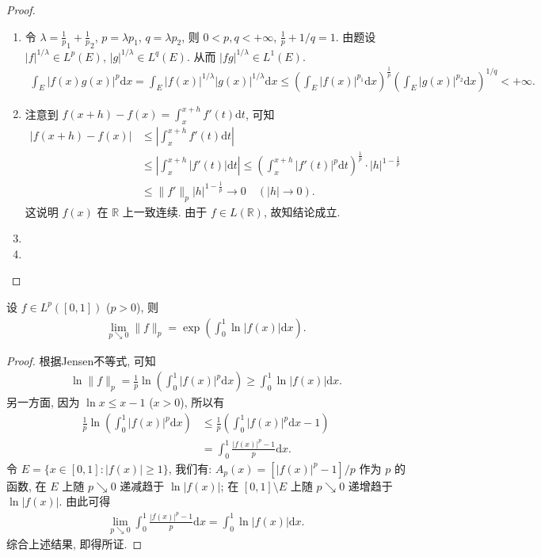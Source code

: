 \documentclass[../../main.tex]{subfiles}%
\begin{document}
\begin{proof}
\begin{enumerate}[(1)]
\item 令 $\lambda=\frac{1}{p}_1+\frac{1}{p}_2$, $p=\lambda p_1$, $q=\lambda p_2$, 则 $0<p,q<+\infty$, $\frac{1}{p}+1/q=1$. 由题设 $|f|^{1/\lambda}\in L^p(E)$, $|g|^{1/\lambda}\in L^q(E)$. 从而 $|fg|^{1/\lambda}\in L^1(E)$.
\begin{align*}
\int_E |f(x)g(x)|^p \mathrm{d}x = \int_E |f(x)|^{1/\lambda} |g(x)|^{1/\lambda} \mathrm{d}x 
\leqslant \left( \int_E |f(x)|^{p_1} \mathrm{d}x \right)^{\frac{1}{p}} \left( \int_E |g(x)|^{p_2} \mathrm{d}x \right)^{1/q} < +\infty.
\end{align*}

\item 注意到 $f(x+h)-f(x)=\int_x^{x+h} f'(t)\mathrm{d}t$, 可知
\begin{align*}
|f(x+h)-f(x)| &\leqslant \left| \int_x^{x+h} f'(t)\mathrm{d}t \right| \\
&\leqslant \left| \int_x^{x+h} |f'(t)|\mathrm{d}t \right| \leqslant \left( \int_x^{x+h} |f'(t)|^p \mathrm{d}t \right)^{\frac{1}{p}} \cdot |h|^{1-\frac{1}{p}} \\
&\leqslant \|f'\|_p |h|^{1-\frac{1}{p}} \to 0 \quad (|h|\to0).
\end{align*}
这说明 $f(x)$ 在 $\mathbb{R}$ 上一致连续. 由于 $f\in L(\mathbb{R})$, 故知结论成立.

\item 

\item 
\end{enumerate}

\end{proof}

\begin{example}
设 $f\in L^p([0,1])$ ($p>0$), 则
\begin{align*}
\lim_{p\searrow0} \|f\|_p = \exp\left( \int_0^1 \ln|f(x)|\mathrm{d}x \right).
\end{align*}
\end{example}
\begin{proof}

根据Jensen不等式, 可知
\begin{align*}
\ln\|f\|_p = \frac{1}{p} \ln\left( \int_0^1 |f(x)|^p \mathrm{d}x \right) \geqslant \int_0^1 \ln|f(x)|\mathrm{d}x.
\end{align*}
另一方面, 因为 $\ln x\leqslant x-1$ ($x>0$), 所以有
\begin{align*}
\frac{1}{p} \ln\left( \int_0^1 |f(x)|^p \mathrm{d}x \right) &\leqslant \frac{1}{p} \left( \int_0^1 |f(x)|^p \mathrm{d}x - 1 \right) \\
&= \int_0^1 \frac{|f(x)|^p - 1}{p} \mathrm{d}x.
\end{align*}
令 $E=\{x\in[0,1]: |f(x)|\geqslant1\}$, 我们有: $A_p(x)=[|f(x)|^p-1]/p$ 作为 $p$ 的函数, 在 $E$ 上随 $p\searrow0$ 递减趋于 $\ln|f(x)|$; 在 $[0,1]\setminus E$ 上随 $p\searrow0$ 递增趋于 $\ln|f(x)|$. 由此可得
\begin{align*}
\lim_{p\searrow0} \int_0^1 \frac{|f(x)|^p - 1}{p} \mathrm{d}x = \int_0^1 \ln|f(x)|\mathrm{d}x.
\end{align*}
综合上述结果, 即得所证.

\end{proof}
\end{document}
